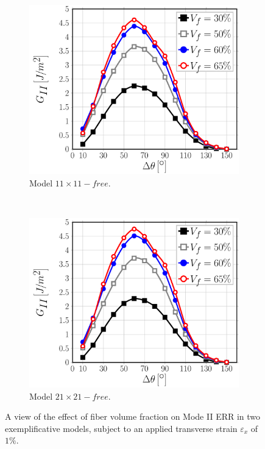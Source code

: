 \begin{figure}[!h]
\centering
    \begin{subfigure}[b]{0.45\textwidth}
        \includegraphics[width=\textwidth]{paperB/vf-smallermodel-GII.pdf}
        \caption{Model $11\times 11-free$.}\label{paperB:subfig:volfracsmallerMII}
    \end{subfigure} ~
    \begin{subfigure}[b]{0.45\textwidth}
        \includegraphics[width=\textwidth]{paperB/vf-biggermodel-GII.pdf}
        \caption{Model $21\times 21-free$.}\label{paperB:subfig:volfracbiggerMII}
    \end{subfigure}

\caption{A view of the effect of fiber volume fraction on Mode II ERR in two exemplificative models, subject to an applied transverse strain $\varepsilon_{x}$ of $1\%$.}\label{paperB:fig:volumefractionMII}
\end{figure}

